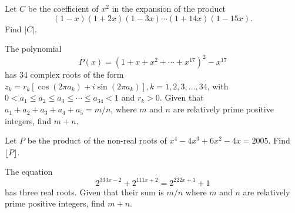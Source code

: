 \documentclass[11pt]{article}
\theoremstyle{definition}
\begin{document}
\begin{question}[name={2004 AIME I, \href{https://artofproblemsolving.com/community/c4p292971}{Problem 7}}]
	Let $C$ be the coefficient of $x^2$ in the expansion of the product\[(1 - x)(1 + 2x)(1 - 3x)\cdots(1 + 14x)(1 - 15x).\]Find $|C|$.
\end{question}


%	














\begin{question}[name={2004 AIME I, \href{https://artofproblemsolving.com/community/c4p378129}{Problem 13}}]
	The polynomial\[P(x)=(1+x+x^2+\cdots+x^{17})^2-x^{17}\]has 34 complex roots of the form $z_k=r_k[\cos(2\pi a_k)+i\sin(2\pi a_k)], k=1, 2, 3,\ldots, 34$, with $0<a_1\le a_2\le a_3\le\cdots\le a_{34}<1$ and $r_k>0$. Given that $a_1+a_2+a_3+a_4+a_5=m/n$, where $m$ and $n$ are relatively prime positive integers, find $m+n$.
\end{question}


%	













\begin{question}[name={2005 AIME I, \href{https://artofproblemsolving.com/community/c4p365524}{Problem 6}}]
	Let $P$ be the product of the non-real roots of $x^4-4x^3+6x^2-4x=2005$. Find $\lfloor P\rfloor$.	
	
\end{question}


%	










\begin{question}[name={2005 AIME I, \href{https://artofproblemsolving.com/community/c4p365560}{Problem 8}}]
	The equation\[2^{333x-2}+2^{111x+2}=2^{222x+1}+1\]has three real roots. Given that their sum is $m/n$ where $m$ and $n$ are relatively prime positive integers, find $m+n$.
\end{question}
\end{document}
